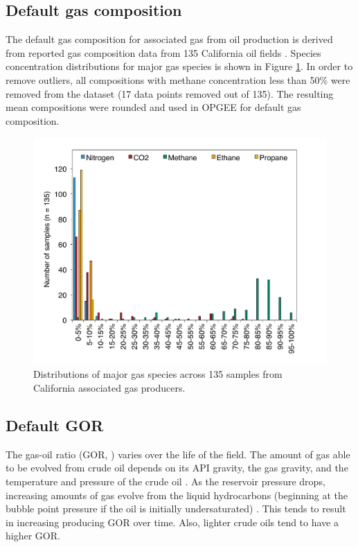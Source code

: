 \documentclass[11pt]{report}
\newcommand{\xlname}[1]{\raisebox{1pt}{\fcolorbox{light-gray}{light-gray}{\texttt{\textcolor{stanford}{\scriptsize{#1}}}}}}
\begin{document}
\subsection{Default gas composition}

The default gas composition for associated gas from oil production is derived from reported gas composition data from 135 California oil fields \cite{Lee2011}. Species concentration distributions for major gas species is shown in Figure \ref{fig:gas_comp_major}. In order to remove outliers, all compositions with methane concentration less than 50\% were removed from the dataset (17 data points removed out of 135). The resulting mean compositions were rounded and used in OPGEE for default gas composition.

\begin{figure}
\includegraphics[width=0.8\columnwidth]{images/gas_comp_major.pdf}
\caption{Distributions of major gas species across 135 samples from California associated gas producers.}
\label{fig:gas_comp_major}
\end{figure}

\subsection{Default GOR} \label{sec:GOR_default}

The gas-oil ratio (GOR, \xlname{GOR}) varies over the life of the field. The amount of gas able to be evolved from crude oil depends on its API gravity, the gas gravity, and the temperature and pressure of the crude oil \cite[p. 297]{Mccain1990}. As the reservoir pressure drops, increasing amounts of gas evolve from the liquid hydrocarbons (beginning at the bubble point pressure if the oil is initially undersaturated) \cite{Mccain1990}. This tends to result in increasing producing GOR over time. Also, lighter crude oils tend to have a higher GOR. 
\end{document}
